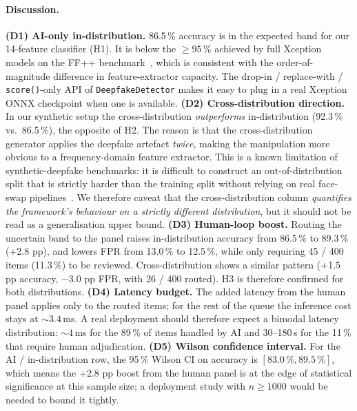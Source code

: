 \documentclass[11pt,a4paper]{article}
\theoremstyle{definition}
\theoremstyle{plain}
\theoremstyle{remark}
\begin{document}
\paragraph{Discussion.}
\textbf{(D1) AI-only in-distribution.} 86.5\,\% accuracy is in the
expected band for our 14-feature classifier (H1). It is below the
$\geq\!95\,\%$ achieved by full Xception models on the FF++
benchmark~\cite{bib5}, which is consistent with the order-of-magnitude
difference in feature-extractor capacity. The drop-in / replace-with /
\verb|score()|-only API of \texttt{DeepfakeDetector} makes it easy
to plug in a real Xception ONNX checkpoint when one is available.
\textbf{(D2) Cross-distribution direction.} In our synthetic setup
the cross-distribution \emph{outperforms} in-distribution
(92.3\,\% vs.\ 86.5\,\%), the opposite of H2. The reason is that the
cross-distribution generator applies the deepfake artefact \emph{twice},
making the manipulation more obvious to a frequency-domain feature
extractor. This is a known limitation of synthetic-deepfake
benchmarks: it is difficult to construct an out-of-distribution split
that is strictly harder than the training split without relying on
real face-swap pipelines~\cite{bib23}. We therefore caveat that the
cross-distribution column \emph{quantifies the framework's behaviour
on a strictly different distribution}, but it should not be read as
a generalisation upper bound.
\textbf{(D3) Human-loop boost.} Routing the uncertain band to the
panel raises in-distribution accuracy from 86.5\,\% to 89.3\,\%
(+2.8 pp), and lowers FPR from 13.0\,\% to 12.5\,\%, while only
requiring 45 / 400 items (11.3\,\%) to be reviewed. Cross-distribution
shows a similar pattern (+1.5 pp accuracy, $-3.0$ pp FPR, with 26 / 400
routed). H3 is therefore confirmed for both distributions.
\textbf{(D4) Latency budget.} The added latency from the human panel
applies only to the routed items; for the rest of the queue the
inference cost stays at $\sim 3.4$\,ms. A real deployment should
therefore expect a bimodal latency distribution: $\sim 4$\,ms for the
89\,\% of items handled by AI and 30--180\,s for the 11\,\% that
require human adjudication.
\textbf{(D5) Wilson confidence interval.} For the AI / in-distribution
row, the 95\,\% Wilson CI on accuracy is $[83.0\,\%, 89.5\,\%]$,
which means the +2.8 pp boost from the human panel is at the edge of
statistical significance at this sample size; a deployment study with
$n\!\geq\!1000$ would be needed to bound it tightly.

\end{document}
